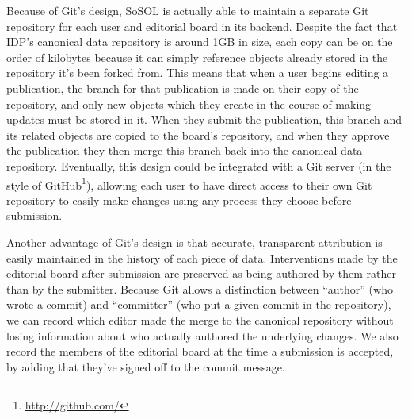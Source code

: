 \documentclass[]{article}
\begin{document}
Because of Git's design, SoSOL is actually able to maintain a separate Git repository for each user and editorial board in its backend. Despite the fact that IDP's canonical data repository is around 1GB in size, each copy can be on the order of kilobytes because it can simply reference objects already stored in the repository it's been forked from. This means that when a user begins editing a publication, the branch for that publication is made on their copy of the repository, and only new objects which they create in the course of making updates must be stored in it. When they submit the publication, this branch and its related objects are copied to the board's repository, and when they approve the publication they then merge this branch back into the canonical data repository. Eventually, this design could be integrated with a Git server (in the style of GitHub\footnote{\url{http://github.com/}}), allowing each user to have direct access to their own Git repository to easily make changes using any process they choose before submission.

Another advantage of Git's design is that accurate, transparent attribution is easily maintained in the history of each piece of data. Interventions made by the editorial board after submission are preserved as being authored by them rather than by the submitter. Because Git allows a distinction between “author” (who wrote a commit) and “committer” (who put a given commit in the repository), we can record which editor made the merge to the canonical repository without losing information about who actually  authored the underlying changes. We also record the members of the editorial board at the time a submission is accepted, by adding that they've signed off to the commit message.
\end{document}
